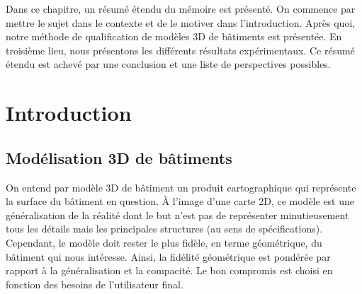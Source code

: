 \minitoc

\vfill

Dans ce chapitre, un résumé étendu du mémoire est présenté.
On commence par mettre le sujet dans le contexte et de le motiver dans l'introduction.
Après quoi, notre méthode de qualification de modèles 3D de bâtiments est présentée.
En troisième lieu, nous présentons les différents résultats expérimentaux.
Ce résumé étendu est achevé par une conclusion et une liste de perspectives possibles.

\clearpage

\section*{Introduction}

    \subsection*{Modélisation 3D de bâtiments}
        On entend par modèle 3D de bâtiment un produit cartographique qui représente la surface du bâtiment en question.
        \`A l'image d'une carte 2D, ce modèle est une généralisation de la réalité dont le but n'est pas de représenter minutieusement tous les détails mais les principales structures (au sens de spécifications).
        Cependant, le modèle doit rester le plus fidèle, en terme géométrique, du bâtiment qui nous intéresse.
        Ainsi, la fidélité géométrique est pondérée par rapport à la généralisation et la compacité.
        Le bon compromis est choisi en fonction des besoins de l'utilisateur final.

